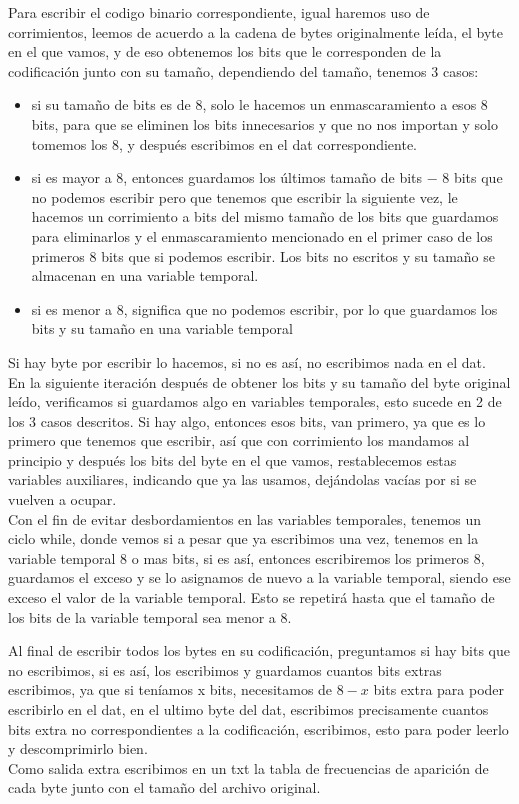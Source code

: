 \documentclass[12 pt]{report}
\begin{document}
Para escribir el codigo binario correspondiente, igual haremos uso de corrimientos, leemos de acuerdo a la cadena de bytes originalmente leída, el byte en el que vamos, y de eso obtenemos los bits que le corresponden de la codificación junto con su tamaño, dependiendo del tamaño, tenemos 3 casos:
\begin{itemize}
\item si su tamaño de bits es de 8, solo le hacemos un enmascaramiento a esos 8 bits, para que se eliminen los bits innecesarios y que no nos importan y solo tomemos los 8, y después escribimos en el dat correspondiente.
\item si es mayor a 8, entonces guardamos los últimos tamaño de bits $-$ 8 bits que no podemos escribir pero que tenemos que escribir la siguiente vez, le hacemos un corrimiento a bits del mismo tamaño de los bits que guardamos para eliminarlos y el enmascaramiento mencionado en el primer caso de los primeros 8 bits que si podemos escribir. Los bits no escritos y su tamaño se almacenan en una variable temporal.
\item si es menor a 8, significa que no podemos escribir, por lo que guardamos los bits y su tamaño en una variable temporal
\end{itemize}
Si hay byte por escribir lo hacemos, si no es así, no escribimos nada en el dat.\\
En la siguiente iteración después de obtener los bits y su tamaño del byte original leído, verificamos si guardamos algo en variables temporales, esto sucede en 2 de los 3 casos descritos. Si hay algo, entonces esos bits, van primero, ya que es lo primero que tenemos que escribir, así que con corrimiento los mandamos al principio y después los bits del byte en el que vamos, restablecemos estas variables auxiliares, indicando que ya las usamos, dejándolas vacías por si se vuelven a ocupar.\\
Con el fin de evitar desbordamientos en las variables temporales, tenemos un ciclo while, donde vemos si a pesar que ya escribimos una vez, tenemos en la variable temporal 8 o mas bits, si es así, entonces escribiremos los primeros 8, guardamos el exceso y se lo asignamos de nuevo a la variable temporal, siendo ese exceso el valor de la variable temporal. Esto se repetirá hasta que el tamaño de los bits de la variable temporal sea menor a 8.

Al final de escribir todos los bytes en su codificación, preguntamos si hay bits que no escribimos, si es así, los escribimos y guardamos cuantos bits extras escribimos, ya que si teníamos x bits, necesitamos de $8-x$ bits extra para poder escribirlo en el dat, en el ultimo byte del dat, escribimos precisamente cuantos bits extra no correspondientes a la codificación, escribimos, esto para poder leerlo y descomprimirlo bien.\\
Como salida extra escribimos en un txt la tabla de frecuencias de aparición de cada byte junto con el tamaño del archivo original.
\end{document}
